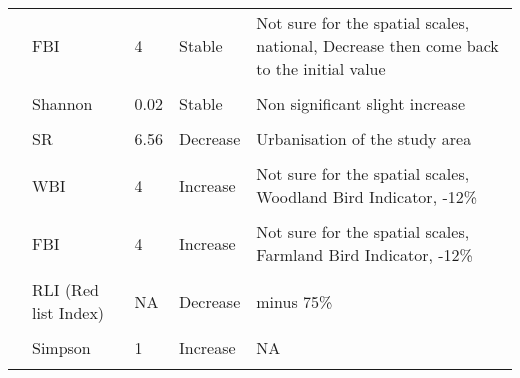 \documentclass[
  12pt,
  oneside]{report}
\begin{document}
\begin{landscape}
\begin{longtable}[t]{llll>{\raggedright\arraybackslash}p{30em}}
\cite{doxa_low-intensity_2010} & FBI & 4 & Stable & Not sure for the spatial scales, national, Decrease then come back to the initial value\\
\addlinespace
\cellcolor{gray!6}{\cite{arnold_contrasting_2021}} & \cellcolor{gray!6}{SR} & \cellcolor{gray!6}{0.02} & \cellcolor{gray!6}{Stable} & \cellcolor{gray!6}{Non significant slight increase}\\
\cite{arnold_contrasting_2021} & Shannon & 0.02 & Stable & Non significant slight increase\\
\cellcolor{gray!6}{\cite{arnold_contrasting_2021}} & \cellcolor{gray!6}{Simpson} & \cellcolor{gray!6}{0.02} & \cellcolor{gray!6}{Stable} & \cellcolor{gray!6}{Non significant slight increase}\\
\cite{xu_detecting_2018} & SR & 6.56 & Decrease & Urbanisation of the study area\\
\cellcolor{gray!6}{\cite{jiguet_french_2012}} & \cellcolor{gray!6}{GBI} & \cellcolor{gray!6}{4} & \cellcolor{gray!6}{Increase} & \cellcolor{gray!6}{Not sure for the spatial scales, Generalist Bird Indicator, +20\%}\\
\addlinespace
\cite{jiguet_french_2012} & WBI & 4 & Increase & Not sure for the spatial scales, Woodland Bird Indicator, -12\%\\
\cellcolor{gray!6}{\cite{jiguet_french_2012}} & \cellcolor{gray!6}{UBI} & \cellcolor{gray!6}{4} & \cellcolor{gray!6}{Increase} & \cellcolor{gray!6}{Not sure for the spatial scales, Urban Bird Indicator, -21\%}\\
\cite{jiguet_french_2012} & FBI & 4 & Increase & Not sure for the spatial scales, Farmland Bird Indicator, -12\%\\
\cellcolor{gray!6}{\cite{jiguet_french_2012}} & \cellcolor{gray!6}{EU bird directive} & \cellcolor{gray!6}{4} & \cellcolor{gray!6}{Increase} & \cellcolor{gray!6}{Not sure for the spatial scales, plus 23\%}\\
\cite{jiguet_french_2012} & RLI (Red list Index) & NA & Decrease & minus 75\%\\
\addlinespace
\cellcolor{gray!6}{\cite{keten_temporal_nodate}} & \cellcolor{gray!6}{SR} & \cellcolor{gray!6}{1.7} & \cellcolor{gray!6}{Stable} & \cellcolor{gray!6}{NA}\\
\cite{davey_rise_2012} & Simpson & 1 & Increase & NA\\
\cellcolor{gray!6}{\cite{davey_rise_2012}} & \cellcolor{gray!6}{SR} & \cellcolor{gray!6}{1} & \cellcolor{gray!6}{Increase} & \cellcolor{gray!6}{NA}\\

\end{longtable}
\end{landscape}
\end{document}
